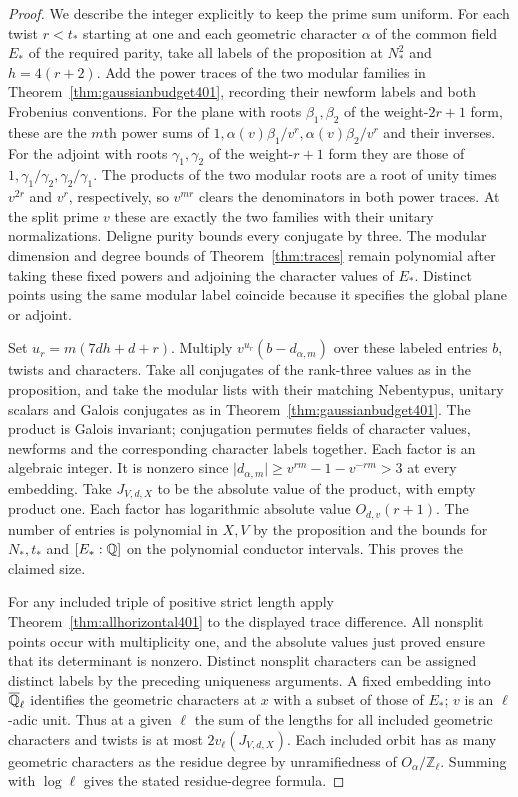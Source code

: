 \documentclass[a4paper,11pt]{article}
\theoremstyle{definition}
\theoremstyle{remark}
\newcommand{\ZZ}{\mathbb Z}\newcommand{\ord}{\operatorname{ord}}
\numberwithin{equation}{section}
\begin{document}
\begin{proof}
We describe the integer explicitly to keep the prime sum uniform.
For each twist \(r<t_*\) starting at one and each geometric
character \(\alpha\) of the common field \(E_*\) of the required
parity, take all labels of the proposition at \(N_*^2\) and
\(h=4(r+2)\). Add the power traces of the two modular families
in Theorem~\ref{thm:gaussianbudget401}, recording their
newform labels and both Frobenius conventions. For the plane
with roots \(\beta_1,\beta_2\) of the weight-\(2r+1\) form,
these are the \(m\)th power sums of
\(1,\alpha(v)\beta_1/v^r,\alpha(v)\beta_2/v^r\) and their
inverses. For the adjoint with roots \(\gamma_1,\gamma_2\) of
the weight-\(r+1\) form they are those of
\(1,\gamma_1/\gamma_2,\gamma_2/\gamma_1\). The products of
the two modular roots are a root of unity times \(v^{2r}\)
and \(v^r\), respectively, so \(v^{mr}\) clears the denominators
in both power traces. At the split prime \(v\) these are exactly
the two families with their unitary normalizations. Deligne
purity bounds every conjugate by three. The modular dimension
and degree bounds of Theorem~\ref{thm:traces} remain polynomial
after taking these fixed powers and adjoining the character
values of \(E_*\). Distinct points using the same modular label
coincide because it specifies the global plane or adjoint.

Set \(u_r=m(7dh+d+r)\). Multiply \(v^{u_r}(b-d_{\alpha,m})\)
over these labeled entries \(b\), twists and characters. Take
all conjugates of the rank-three values as in the proposition,
and take the modular lists with their matching Nebentypus,
unitary scalars and Galois conjugates as in
Theorem~\ref{thm:gaussianbudget401}. The product is Galois
invariant; conjugation permutes fields of character values,
newforms and the corresponding character labels together.
Each factor is an algebraic integer. It is nonzero since
\(\lvert d_{\alpha,m}\rvert\ge v^{rm}-1-v^{-rm}>3\)
at every embedding. Take \(J_{V,d,X}\) to be the absolute value
of the product, with empty product one. Each factor has
logarithmic absolute value \(O_{d,v}(r+1)\). The number of
entries is polynomial in \(X,V\) by the proposition and the
bounds for \(N_*,t_*\) and \([E_*:\mathbb Q]\) on the polynomial
conductor intervals. This proves the claimed size.

For any included triple of positive strict length apply
Theorem~\ref{thm:allhorizontal401} to the displayed trace
difference. All nonsplit points occur with multiplicity one,
and the absolute values just proved ensure that its determinant
is nonzero. Distinct nonsplit characters can be assigned
distinct labels by the preceding uniqueness arguments. A fixed
embedding into \(\overline{\mathbb Q}_\ell\) identifies the geometric
characters at \(x\) with a subset of those of \(E_*\);
\(v\) is an \(\ell\)-adic unit. Thus at a given \(\ell\) the sum
of the lengths for all included geometric characters and twists
is at most \(2v_\ell(J_{V,d,X})\). Each included orbit has as many geometric characters as the
residue degree by unramifiedness of \(O_\alpha/\ZZ_\ell\). Summing with \(\log\ell\) gives the stated
residue-degree formula.
\end{proof}
\end{document}
